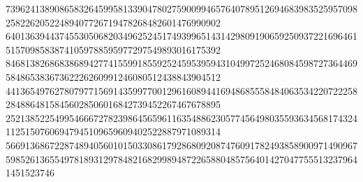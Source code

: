 {73962413890865832645995813390478027590099465764078951269468398352595709825822620522489407726719478268482601476990902\\
64013639443745530506820349625245174939965143142980919065925093722169646151570985838741059788595977297549893016175392\\
84681382686838689427741559918559252459539594310499725246808459872736446958486538367362226260991246080512438843904512\\
44136549762780797715691435997700129616089441694868555848406353422072225828488648158456028506016842739452267467678895\\
25213852254995466672782398645659611635488623057745649803559363456817432411251507606947945109659609402522887971089314\\
5669136867228748940560101503308617928680920874760917824938589009714909675985261365549781893129784821682998948722658804857564014270477555132379641451523746
}
